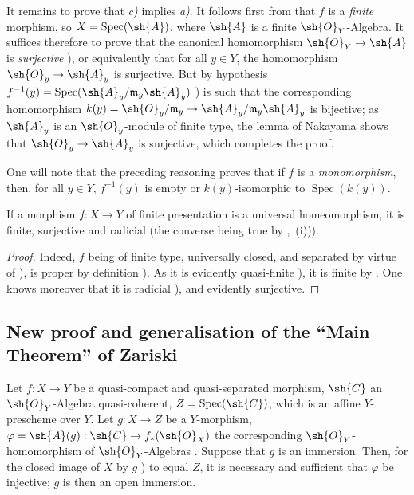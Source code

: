 
It remains to prove that \emph{c)} implies \emph{a)}.
It follows first from  that $f$ is a \emph{finite} morphism, so $X=\operatorname{Spec}(\sh{A})$, where $\sh{A}$ is a finite $\sh{O}_Y$-Algebra.
It suffices therefore to prove that the canonical homomorphism $\sh{O}_Y\to\sh{A}$ is \emph{surjective} ), or equivalently that for all $y\in Y$, the homomorphism $\sh{O}_y\to\sh{A}_y$ is surjective.
But by hypothesis $f^{-1}(y)=\operatorname{Spec}(\sh{A}_y/\mathfrak{m}_y\sh{A}_y)$ ) is such that the corresponding homomorphism $k(y)=\sh{O}_y/\mathfrak{m}_y\to\sh{A}_y/\mathfrak{m}_y\sh{A}_y$ is bijective; as $\sh{A}_y$ is an $\sh{O}_y$-module of finite type, the lemma of Nakayama shows that $\sh{O}_y\to\sh{A}_y$ is surjective, which completes the proof.

\begin{remark}[8.11.5.1]
\label{IV.8.11.5.1}
One will note that the preceding reasoning proves that if $f$ is a \emph{monomorphism}, then, for all $y\in Y$, $f^{-1}(y)$ is empty or $k(y)$-isomorphic to $\operatorname{Spec}(k(y))$.
\end{remark}

\begin{proposition}[8.11.6]
\label{IV.8.11.6}
If a morphism $f:X\to Y$ of finite presentation is a universal homeomorphism, it is finite, surjective and radicial (the converse being true by ,~(i))).
\end{proposition}

\begin{proof}
Indeed, $f$ being of finite type, universally closed, and separated by virtue of ), is proper by definition ).
As it is evidently quasi-finite ), it is finite by .
One knows moreover that it is radicial ), and evidently surjective.
\end{proof}

\subsection{New proof and generalisation of the ``Main Theorem'' of Zariski}
\label{subsection:IV.8.12}
\label{IV.8.12}

\begin{lemma}[8.12.1]
\label{IV.8.12.1}
Let $f:X\to Y$ be a quasi-compact and quasi-separated morphism, $\sh{C}$ an $\sh{O}_Y$-Algebra quasi-coherent, $Z=\operatorname{Spec}(\sh{C})$, which is an affine $Y$-prescheme over $Y$.
Let $g:X\to Z$ be a $Y$-morphism, $\varphi=\sh{A}(g):\sh{C}\to f_*(\sh{O}_X)$ the corresponding $\sh{O}_Y$-homomorphism of $\sh{O}_Y$-Algebras .
Suppose that $g$ is an immersion.
Then, for the closed image of $X$ by $g$ ) to equal $Z$, it is necessary and sufficient that $\varphi$ be injective; $g$ is then an open immersion.
\end{lemma}

